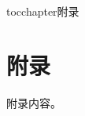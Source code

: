 
\newenvironment{theappendix}{\wuhao\song}

\addcontentsline{toc}{chapter}{附录}%
\chapter*{\centering\xiaosan\hei\bfseries 附\quad 录}

\begin{theappendix}

附录内容。

\end{theappendix}

